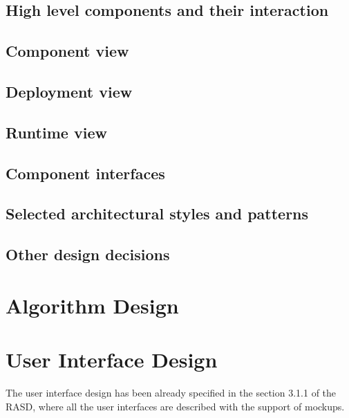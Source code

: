 \documentclass[18pt,oneside,a4paper, titlepage]{article}
\begin{document}
		\subsection{High level components and their interaction}
		\subsection{Component view}
		\subsection{Deployment view}
		\subsection{Runtime view}
		
		\subsection{Component interfaces}
		\subsection{Selected architectural styles and patterns}
			
		\subsection{Other design decisions}
		
	\section{Algorithm Design}
		
	\section{User Interface Design}
		The user interface design has been already specified in the section 3.1.1 of the RASD, where all the user interfaces are described with the support of mockups.
		
\end{document}
